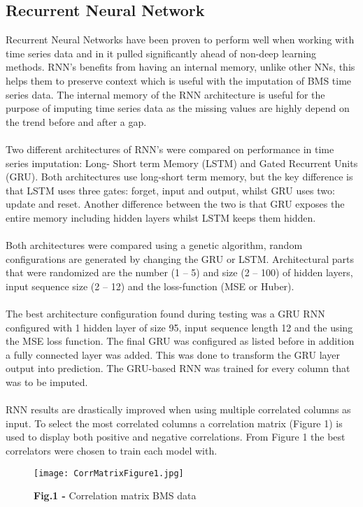 \documentclass[9.5pt,article,twocolumn]{article}
\begin{document}
\subsection{Recurrent Neural Network}
Recurrent Neural Networks have been proven to perform well when working with time series data \cite{Cheng} and in \cite{Che} it pulled significantly ahead of non-deep learning methods. RNN’s benefits from having an internal memory, unlike other NNs, this helps them to preserve context which is useful with the imputation of BMS time series data. The internal memory of the RNN architecture is useful for the purpose of imputing time series data as the missing values are highly depend on the trend before and after a gap.  \\
\\
Two different architectures of RNN’s were compared on performance in time series imputation: Long- Short term Memory (LSTM) and Gated Recurrent Units (GRU). Both architectures use long-short term memory, but the key difference is that LSTM uses three gates: forget, input and output, whilst GRU uses two: update and reset. Another difference between the two is that GRU exposes the entire memory including hidden layers whilst LSTM keeps them hidden.
\\
\\
Both architectures were compared using a genetic algorithm, random configurations are generated by changing the GRU or LSTM. Architectural parts that were randomized are the number (1 – 5) and size (2 – 100) of hidden layers, input sequence size (2 – 12) and the loss-function (MSE or Huber). 
\\
\\
The best architecture configuration found during testing was a GRU RNN configured with 1 hidden layer of size 95, input sequence length 12 and the using the MSE loss function. The final GRU was configured as listed before in addition a fully connected layer was added. This was done to transform the GRU layer output into prediction. The GRU-based RNN was trained for every column that was to be imputed.
\\
\\
RNN results are drastically improved when using multiple correlated columns as input. To select the most correlated columns a correlation matrix (Figure 1) is used to display both positive and negative correlations. From Figure 1 the best correlators were chosen to train each model with.
\begin{figure}
    \centering
    \texttt{[image: CorrMatrixFigure1.jpg]}
    \label{fig:my_label}
    \vspace{-0.7cm}
    \begin{flushleft}
    \begingroup
        \fontsize{9pt}{9pt}\selectfont
        \textbf{Fig.1 -} Correlation matrix BMS data
    \endgroup
    \vspace{-0.2cm}
    \end{flushleft}
\end{figure}
\end{document}
